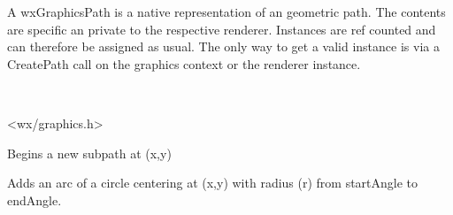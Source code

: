 
\section{}\label{wxgraphicspath}

A wxGraphicsPath is a native representation of an geometric path. The contents are specific an private to the respective renderer. Instances are ref counted and can 
therefore be assigned as usual. The only way to get a valid instance is via a CreatePath call on the graphics context or the renderer instance.


\\


<wx/graphics.h>




\label{wxgraphicspathmovetopoint}



Begins a new subpath at (x,y)

\label{wxgraphicspathaddarc}


Adds an arc of a circle centering at (x,y) with radius (r) from startAngle to endAngle.


